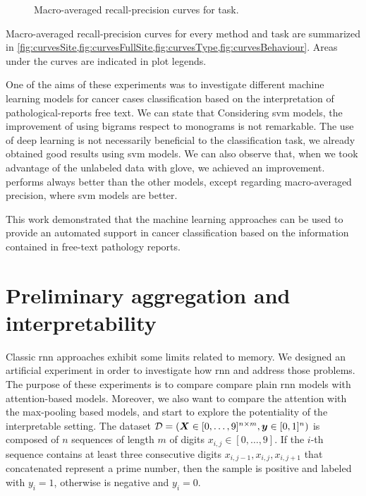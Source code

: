 \begin{figure}
  \centering
  \resizebox{0.9\textwidth}{!}{}
  \caption{Macro-averaged recall-precision curves for \behaviour{} task.}
  \label{fig:curvesBehaviour}
\end{figure}

Macro-averaged recall-precision curves for every method and task are
summarized in
\cref{fig:curvesSite,fig:curvesFullSite,fig:curvesType,fig:curvesBehaviour}. Areas
under the curves are indicated in 
plot legends.

One of the aims of these experiments was to investigate different
machine learning 
models for cancer cases classification based on the interpretation
of pathological-reports free text. We can state that
Considering \ac{svm} models, the improvement of using
bigrams respect to monograms is not remarkable.
The use of deep learning is not necessarily beneficial to the
classification task, we already obtained good results using \ac{svm}
models. We can also observe that, when we took 
advantage of the unlabeled data with \ac{glove}, we achieved an
improvement.
\lstmb{} performs always better than the other models, except
regarding macro-averaged precision, where \ac{svm} models are better.

This work demonstrated that the machine learning approaches can be
used to provide an automated support in cancer classification based on
the information contained in free-text pathology reports.

\section{Preliminary aggregation and interpretability}
\label{ch:artificial}

Classic \ac{rnn} approaches exhibit some limits related to
memory. We designed an artificial experiment in
order to investigate how \ac{rnn} and \maxp{} address those
problems. The purpose of these experiments is to compare compare plain
\ac{rnn} models with attention-based models. Moreover, we also want to
compare the attention with the max-pooling based models, and start to
explore the potentiality of the interpretable setting. The dataset 
$\mathcal{D}=(\bm{X}\in [0,\dots,9]^{n\times m},\bm{y}\in [0,1]^n)$ is
composed of $n$ sequences of length
$m$ of digits $x_{i,j}\in[0,\dots,9]$. If the $i$-th sequence contains
at least three consecutive digits
$x_{i,j-1},x_{i,j},x_{i,j+1}$ that concatenated represent a prime
number, then the
sample is positive and labeled with $y_i=1$, otherwise is negative and
$y_i=0$.

